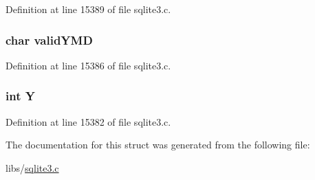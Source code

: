 Definition at line 15389 of file sqlite3.\+c.

\hypertarget{struct_date_time_a3ecbd19a3a69417f900bb897e848f86d}{}
\subsubsection[{valid\+Y\+M\+D}]{\setlength{\rightskip}{0pt plus 5cm}char valid\+Y\+M\+D}\label{struct_date_time_a3ecbd19a3a69417f900bb897e848f86d}


Definition at line 15386 of file sqlite3.\+c.

\hypertarget{struct_date_time_aa482c4cc86a24474e4fb19b5b5978778}{}
\subsubsection[{Y}]{\setlength{\rightskip}{0pt plus 5cm}int Y}\label{struct_date_time_aa482c4cc86a24474e4fb19b5b5978778}


Definition at line 15382 of file sqlite3.\+c.



The documentation for this struct was generated from the following file\+:\begin{DoxyCompactItemize}
\item 
libs/\hyperlink{sqlite3_8c}{sqlite3.\+c}\end{DoxyCompactItemize}
